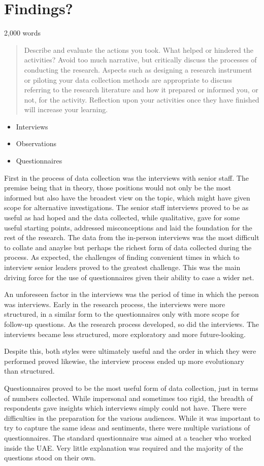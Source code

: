 \section{Findings?}
2,000 words 

\begin{quote}
Describe and evaluate the actions you took. What helped or hindered the activities? Avoid too much narrative, but critically discuss the processes of conducting the research. Aspects such as designing a research instrument or piloting your data collection methods are appropriate to discuss referring to the research literature and how it prepared or informed you, or not, for the activity. Reflection upon your activities once they have finished will increase your learning.
\end{quote}

\begin{itemize}
\item Interviews
\item Observations
\item Questionnaires 
\end{itemize}

First in the process of data collection was the interviews with senior staff. The premise being that in theory, those positions would not only be the most informed but also have the broadest view on the topic, which might have given scope for alternative investigations. The senior staff interviews proved to be as useful as had hoped and the data collected, while qualitative, gave for some useful starting points, addressed misconceptions and laid the foundation for the rest of the research. The data from the in-person interviews was the most difficult to collate and anaylse but perhaps the richest form of data collected during the process. As expected, the challenges of finding convenient times in which to interview senior leaders proved to the greatest challenge. This was the main driving force for the use of questionnaires given their ability to case a wider net. 

An unforeseen factor in the interviews was the period of time in which the person was interviews. Early in the research process, the interviews were more structured, in a similar form to the questionnaires only with more scope for follow-up questions. As the research process developed, so did the interviews. The interviews became less structured, more exploratory and more future-looking.

Despite this, both styles were ultimately useful and the order in which they were performed proved likewise, the interview process ended up more evolutionary than structured.

Questionnaires proved to be the most useful form of data collection, just in terms of numbers collected. While impersonal and sometimes too rigid, the breadth of respondents gave insights which interviews simply could not have. There were difficulties in the preparation for the various audiences. While it was important to try to capture the same ideas and sentiments, there were multiple variations of questionnaires. The standard questionnaire was aimed at a teacher who worked inside the UAE. Very little explanation was required and the majority of the questions stood on their own. 
